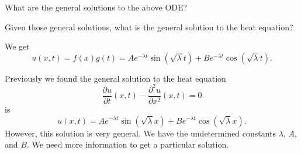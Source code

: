         \begin{exercise}
        What are the general solutions to the above ODE?
        \end{exercise}
        
        \begin{exercise}
        Given those general solutions, what is the general solution to the heat equation?
        \end{exercise}
        
        \begin{answer}
        We get
        \[
        \boxed{u(x,t)=f(x)g(t) = Ae^{-\lambda t}\sin(\sqrt{\lambda}t)+Be^{-\lambda t}\cos(\sqrt{\lambda}t).}
        \]
        \end{answer}
        
        Previously we found the general solution to the heat equation 
        \[
        \frac{\partial u}{\partial t}(x,t) - \frac{\partial^2 u}{\partial x^2} (x,t) = 0
        \]
        is
        \[
        u(x,t)=Ae^{-\lambda t}\sin(\sqrt{\lambda}x)+Be^{-\lambda t}\cos(\sqrt{\lambda}x).
        \]
        However, this solution is very general.  We have the undetermined constants $\lambda$, $A$, and $B$. We need more information to get a particular solution.
        
